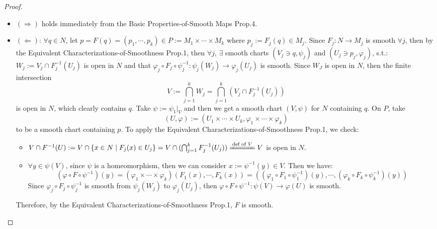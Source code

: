 \begin{proof}
    \begin{itemize}
        \item $(\Rightarrow)$ holds immediately from the Basic Properties-of-Smooth Maps Prop.4.
        \item $(\Leftarrow)$: $\forall q\in N$, let $p=F(q)= (p_1 ,\cdots, p_k) \in P:= M_1 \times \cdots \times M_k$ where $p_j:= F_j(q) \in M_j$. Since $F_j:N\to M_j$ is smooth $\forall j$, then by the Equivalent Characterizations-of-Smoothness Prop.1, then $\forall j$, $\exists$ smooth charts $(V_j \ni q,\psi_j)$ and $(U_j \ni p_j, \varphi_j)$, s.t.: $W_j:= V_j \cap F_j^{-1} (U_j)$ is open in $N$ and that $\varphi_j \circ F_j \circ \psi^{-1}_j: \psi_j (W_j) \to \varphi_j(U_j)$ is smooth. Since $W_J$ is open in $N$, then the finite intersection
        \[
        V:= \bigcap_{j=1}^k W_j = \bigcap_{j=1}^k (V_j \cap F^{-1} _j(U_j))
        \]
        is open in $N$, which clearly contains $q$. Take $\psi:= \psi_1|_{V}$ and then we get a smooth chart $(V,\psi)$ for $N$ containing $q$. On $P$, take
        \[
        (U,\varphi):= (U_1 \times \cdots \times U_k, \varphi_1 \times \cdots\times \varphi_k)
        \]
        to be a smooth chart containing $p$. To apply the Equivalent Characterizations-of-Smoothness Prop.1, we check:
        \begin{itemize}
            \item $V\cap F^{-1}(U):= V\cap \{ x\in N\mid F_j(x) \in U_j\}= V\cap (\bigcap_{j=1}^k F_j^{-1} (U_j)) \xlongequal{\text{def of }V} V$ is open in $N$.
            \item $\forall y\in \psi(V)$, since $\psi$ is a homeomorphism, then we can  consider $x:= \psi^{-1}(y) \in V$. Then we have:
            \[
            (\varphi \circ F\circ \psi^{-1}) (y)= (\varphi_1 \times \cdots \times \varphi_k) (F_1 (x), \cdots, F_k(x))= ((\varphi_1 \circ F_1 \circ \psi_1^{-1}) (y), \cdots, (\varphi_k \circ F_k\circ \psi_k^{-1}) (y))
            \]
            Since $\varphi_j \circ F_j \circ \psi_j^{-1}$ is smooth from $\psi_j (W_j)$ to $\varphi_j (U_j)$, then $\varphi \circ F\circ \psi^{-1}: \psi(V) \to \varphi(U)$ is smooth.
        \end{itemize}
        Therefore, by the Equivalent Characterizations-of-Smoothness Prop.1, $F$ is smooth.
    \end{itemize}
\end{proof}

